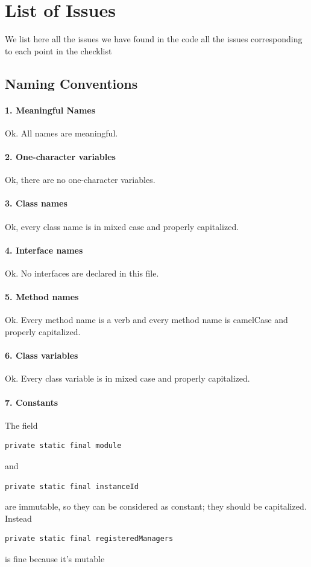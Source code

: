 \documentclass[english]{article}
\begin{document}
\section{List of Issues} %
We list here all the issues we have found in the code
all the issues corresponding to each point in the checklist


\subsection{Naming Conventions}

\paragraph{1. Meaningful Names}
Ok. All names are meaningful.

\paragraph{2. One-character variables}
Ok, there are no one-character variables.

\paragraph{3. Class names}
Ok, every class name is in mixed case and properly capitalized.

\paragraph{4. Interface names}
Ok. No interfaces are declared in this file.

\paragraph{5. Method names}
Ok. Every method name is a verb and every method name is camelCase and properly capitalized.

\paragraph{6. Class variables}
Ok. Every class variable is in mixed case and properly capitalized.

\paragraph{7. Constants}
The field 
\begin{lstlisting} 
private static final module 
\end{lstlisting} 
and 
\begin{lstlisting} 
private static final instanceId 
\end{lstlisting} 
are immutable, so they can be considered as constant; they should be capitalized. \\
Instead 
\begin{lstlisting} 
private static final registeredManagers 
\end{lstlisting}
 is fine because it's mutable
\end{document}
